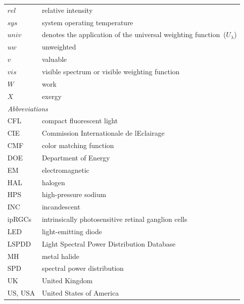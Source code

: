 \documentclass[energies,article,accept,moreauthors,pdftex]{Definitions/mdpi}\usepackage[]{graphicx}\usepackage[]{color}
\begin{document}
\noindent
\begin{tabular}{ll}
  $rel$ & relative intensity \\
  $sys$ & system operating temperature \\
  $univ$ & denotes the application of the universal weighting function~($U_\lambda$) \\
  $uw$ & unweighted \\
  $v$ & valuable \\
  $vis$ & visible spectrum or visible weighting function \\
  $W$ & work \\
  $X$ & exergy \\
%
\multicolumn{2}{l}{\emph{Abbreviations}} \\ 
%
  CFL & compact fluorescent light \\
  CIE & Commission Internationale de l\textquotesingle{}Eclairage \\
  CMF & color matching function \\
  DOE & Department of Energy \\
  EM & electromagnetic \\
  HAL & halogen \\
  HPS & high-pressure sodium \\
  INC & incandescent \\
  ipRGCs & intrinsically photosensitive retinal ganglion cells \\
  LED & light-emitting diode \\
  LSPDD & Light Spectral Power Distribution Database \\
  MH & metal halide \\
  SPD & spectral power distribution \\
  UK & United Kingdom \\
  US, USA & United States of America \\
\end{tabular}
\end{document}
